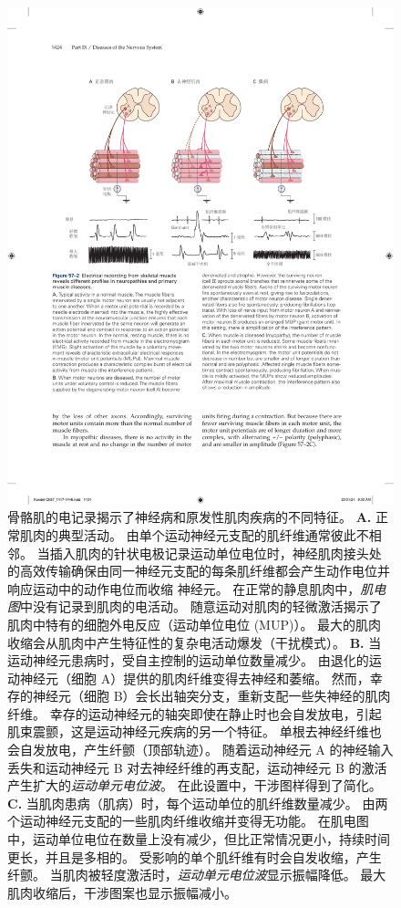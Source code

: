 \begin{figure}[htbp]
	\centering
	\includegraphics[width=0.8\linewidth]{chap57/fig_57_2}
	\caption{骨骼肌的电记录揭示了神经病和原发性肌肉疾病的不同特征。
		\textbf{A.} 正常肌肉的典型活动。
		由单个运动神经元支配的肌纤维通常彼此不相邻。
		当插入肌肉的针状电极记录运动单位电位时，神经肌肉接头处的高效传输确保由同一神经元支配的每条肌纤维都会产生动作电位并响应运动中的动作电位而收缩 神经元。
		在正常的静息肌肉中，\textit{肌电图}中没有记录到肌肉的电活动。
		随意运动对肌肉的轻微激活揭示了肌肉中特有的细胞外电反应（运动单位电位 (MUP)）。
		最大的肌肉收缩会从肌肉中产生特征性的复杂电活动爆发（干扰模式）。
		\textbf{B.} 当运动神经元患病时，受自主控制的运动单位数量减少。
		由退化的运动神经元（细胞 A）提供的肌肉纤维变得去神经和萎缩。
		然而，幸存的神经元（细胞 B）会长出轴突分支，重新支配一些失神经的肌肉纤维。
		幸存的运动神经元的轴突即使在静止时也会自发放电，引起肌束震颤，这是运动神经元疾病的另一个特征。
		单根去神经纤维也会自发放电，产生纤颤（顶部轨迹）。
		随着运动神经元 A 的神经输入丢失和运动神经元 B 对去神经纤维的再支配，运动神经元 B 的激活产生扩大的\textit{运动单元电位波}。
		在此设置中，干涉图样得到了简化。
		\textbf{C.} 当肌肉患病（肌病）时，每个运动单位的肌纤维数量减少。 由两个运动神经元支配的一些肌肉纤维收缩并变得无功能。
		在肌电图中，运动单位电位在数量上没有减少，但比正常情况更小，持续时间更长，并且是多相的。
		受影响的单个肌纤维有时会自发收缩，产生纤颤。 当肌肉被轻度激活时，\textit{运动单元电位波}显示振幅降低。
		最大肌肉收缩后，干涉图案也显示振幅减小。}
	\label{fig:57_2}
\end{figure}



